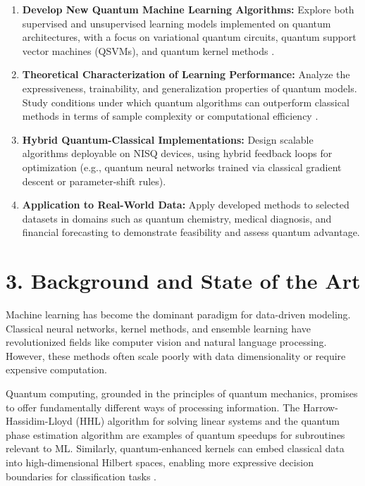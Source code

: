 \documentclass[11pt]{article}
\begin{document}
\begin{enumerate}
  \item \textbf{Develop New Quantum Machine Learning Algorithms:} Explore both supervised and unsupervised learning models implemented on quantum architectures, with a focus on variational quantum circuits, quantum support vector machines (QSVMs), and quantum kernel methods \cite{havlicek2019, rebentrost2014}.
  
  \item \textbf{Theoretical Characterization of Learning Performance:} Analyze the expressiveness, trainability, and generalization properties of quantum models. Study conditions under which quantum algorithms can outperform classical methods in terms of sample complexity or computational efficiency \cite{schuld2021}.
  
  \item \textbf{Hybrid Quantum-Classical Implementations:} Design scalable algorithms deployable on NISQ devices, using hybrid feedback loops for optimization (e.g., quantum neural networks trained via classical gradient descent or parameter-shift rules).
  
  \item \textbf{Application to Real-World Data:} Apply developed methods to selected datasets in domains such as quantum chemistry, medical diagnosis, and financial forecasting to demonstrate feasibility and assess quantum advantage.
\end{enumerate}

\section*{3. Background and State of the Art}

Machine learning has become the dominant paradigm for data-driven modeling. Classical neural networks, kernel methods, and ensemble learning have revolutionized fields like computer vision and natural language processing. However, these methods often scale poorly with data dimensionality or require expensive computation.

Quantum computing, grounded in the principles of quantum mechanics, promises to offer fundamentally different ways of processing information. The Harrow-Hassidim-Lloyd (HHL) algorithm for solving linear systems \cite{harrow2009} and the quantum phase estimation algorithm are examples of quantum speedups for subroutines relevant to ML. Similarly, quantum-enhanced kernels can embed classical data into high-dimensional Hilbert spaces, enabling more expressive decision boundaries for classification tasks \cite{schuld2019}.
\end{document}
